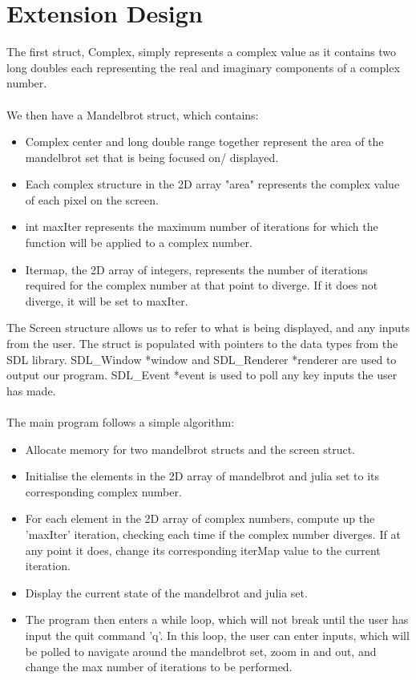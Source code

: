 \documentclass[11pt]{article}
\begin{document}
\section{Extension Design}
The first struct, Complex, simply represents a complex value as it contains two 
long doubles each representing the real and imaginary components of a complex 
number.
\\~\\
We then have a Mandelbrot struct, which contains:
\begin{itemize}
    \item Complex center and long double range together represent the area of the
    mandelbrot set that is being focused on/ displayed.
    \item Each complex structure in the 2D array "area" represents the complex
    value of each pixel on the screen.
    \item int maxIter represents the maximum number of iterations for which the 
    function will be applied to a complex number.
    \item Itermap, the 2D array of integers, represents the number of iterations
    required for the complex number at that point to diverge. If it does not diverge,
    it will be set to maxIter.
\end{itemize}
The Screen structure allows us to refer to what is being displayed, and
any inputs from the user. The struct is populated with pointers to the data 
types from the SDL library. SDL\_Window *window and SDL\_Renderer *renderer
are used to output our program. SDL\_Event *event is used to poll any key inputs
the user has made.
\\~\\
The main program follows a simple algorithm:
\begin{itemize}
    \item Allocate memory for two mandelbrot structs and the screen struct.
    \item Initialise the elements in the 2D array of mandelbrot and julia set to its
    corresponding complex number.
    \item For each element in the 2D array of complex numbers, compute up the 'maxIter' 
    iteration, checking each time if the complex number diverges. If at any point it
    does, change its corresponding iterMap value to the current iteration.
    \item Display the current state of the mandelbrot and julia set.  
    \item The program then enters a while loop, which will not break until the user has
    input the quit command 'q'. In this loop, the user can enter inputs, which
    will be polled to navigate around the mandelbrot set, zoom in and out, and
    change the max number of iterations to be performed.
\end{itemize}
\end{document}
